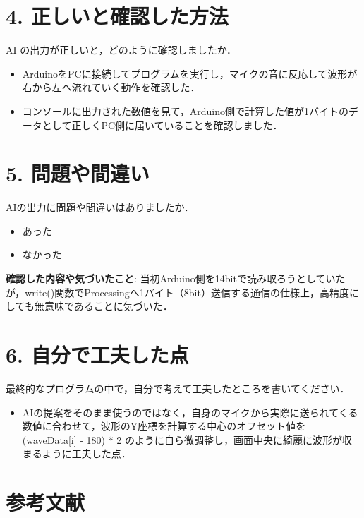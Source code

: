 \documentclass[a4paper,11pt]{jsarticle}
\begin{document}
\section*{4. 正しいと確認した方法}
AI の出力が正しいと，どのように確認しましたか．
\begin{itemize}
    \item ArduinoをPCに接続してプログラムを実行し，マイクの音に反応して波形が右から左へ流れていく動作を確認した．
    \item コンソールに出力された数値を見て，Arduino側で計算した値が1バイトのデータとして正しくPC側に届いていることを確認しました．
\end{itemize}

\section*{5. 問題や間違い}
AIの出力に問題や間違いはありましたか．
\begin{itemize}
    \item[$\boxtimes$] あった
    \item[$\square$] なかった
\end{itemize}
\textbf{確認した内容や気づいたこと}:
当初Arduino側を14bitで読み取ろうとしていたが，write()関数でProcessingへ1バイト（8bit）送信する通信の仕様上，高精度にしても無意味であることに気づいた．

\section*{6. 自分で工夫した点}
最終的なプログラムの中で，自分で考えて工夫したところを書いてください．
\begin{itemize}
    \item AIの提案をそのまま使うのではなく，自身のマイクから実際に送られてくる数値に合わせて，波形のY座標を計算する中心のオフセット値を (waveData[i] - 180) * 2 のように自ら微調整し，画面中央に綺麗に波形が収まるように工夫した点．
\end{itemize}

\section*{参考文献}
\end{document}
